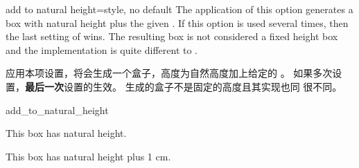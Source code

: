 \begin{docTcbKey}[][doc new=2016-02-16]{add to natural height}{=}{style, no default}
The application of this option generates a box with natural height plus
the given . If this option is used several times, then the
last setting of  wins. The resulting box is not considered
a fixed height box and the implementation is quite different to
.

应用本项设置，将会生成一个盒子，高度为自然高度加上给定的 。
如果多次设置，{\bf 最后一次}设置的生效。 生成的盒子不是固定的高度且其实现也同  很不同。
\begin{exdispExample}{add_to_natural_height}

\begin{tcolorbox}
This box has natural height.
\end{tcolorbox}
\begin{tcolorbox}[add to natural height=1cm]
This box has natural height plus 1 cm.
\end{tcolorbox}
\end{exdispExample}
\end{docTcbKey}



